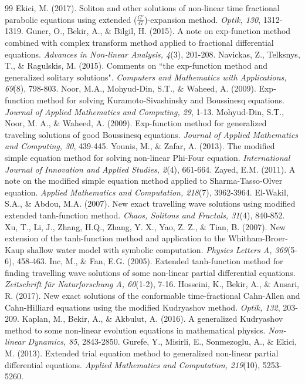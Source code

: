 \documentclass{article}
\numberwithin{equation}{section}
\begin{document}
\begin{thebibliography}{99}
 Ekici, M. (2017). Soliton and other solutions of non-linear time fractional parabolic equations using extended ($\frac{G'}{G}$)-expansion method. \emph{Optik, 130}, 1312-1319.
 Guner, O., Bekir, A., ${\&}$ Bilgil, H. (2015). A note on exp-function method combined with complex transform method applied to fractional differential equations. \emph{Advances in Non-linear Analysis, 4}(3), 201-208.
 Navickas, Z., Telksnys, T., ${\&}$ Ragulskis, M. (2015). Comments on ``the exp-function method and generalized solitary solutions". \emph{Computers and Mathematics with Applications, 69}(8), 798-803.
 Noor, M.A., Mohyud-Din, S.T., ${\&}$ Waheed, A. (2009). Exp-function method for solving Kuramoto-Sivashinsky and Boussinesq equations. \emph{Journal of Applied Mathematics and Computing, 29}, 1-13.
 Mohyud-Din, S.T., Noor, M. A., ${\&}$ Waheed, A. (2009). Exp-function method for generalized traveling solutions of good Boussinesq equations. \emph{Journal of Applied Mathematics and Computing, 30}, 439-445.
 Younis, M., ${\&}$ Zafar, A. (2013). The modified simple equation method for solving non-linear Phi-Four equation. \emph{International Journal of Innovation and Applied Studies, 2}(4), 661-664.
 Zayed, E.M. (2011). A note on the modified simple equation method applied to Sharma-Tasso-Olver equation. \emph{Applied Mathematics and Computation, 218}(7), 3962-3964.
 El-Wakil, S.A., ${\&}$ Abdou, M.A. (2007). New exact travelling wave solutions using modified extended tanh-function method. \emph{Chaos, Solitons and Fractals, 31}(4), 840-852.
 Xu, T., Li, J., Zhang, H.Q., Zhang, Y. X., Yao, Z. Z., ${\&}$ Tian, B. (2007). New extension of the tanh-function method and application to the Whitham-Broer-Kaup shallow water model with symbolic computation. \emph{Physics Letters A, 369}(5-6), 458-463.
 Inc, M., ${\&}$ Fan, E.G. (2005). Extended tanh-function method for finding travelling wave solutions of some non-linear partial differential equations. \emph{Zeitschrift f\"{u}r Naturforschung A, 60}(1-2), 7-16.
 Hosseini, K., Bekir, A., ${\&}$ Ansari, R. (2017). New exact solutions of the conformable time-fractional Cahn-Allen and Cahn-Hilliard equations using the modified Kudryashov method. \emph{Optik, 132}, 203-209.
 Kaplan, M., Bekir, A., ${\&}$ Akbulut, A. (2016). A generalized Kudryashov method to some non-linear evolution equations in mathematical physics. \emph{Non-linear Dynamics, 85}, 2843-2850.
Gurefe, Y., Misirli, E., Sonmezoglu, A., ${\&}$ Ekici, M. (2013). Extended trial equation method to generalized non-linear partial differential equations. \emph{Applied Mathematics and Computation, 219}(10), 5253-5260.

\end{thebibliography}
\end{document}
